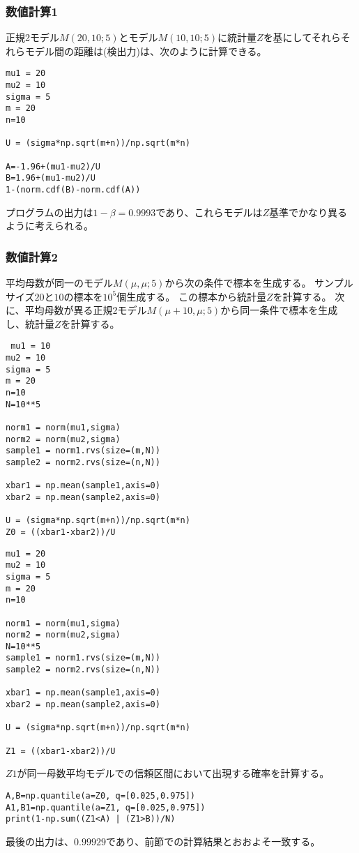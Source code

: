 \subsubsection{数値計算1}
正規2モデル$M(20,10;5)$とモデル$M(10,10;5)$に統計量$Z$を基にしてそれらそれらモデル間の距離は(検出力)は、次のように計算できる。
\begin{lstlisting}
mu1 = 20
mu2 = 10
sigma = 5
m = 20
n=10

U = (sigma*np.sqrt(m+n))/np.sqrt(m*n)

A=-1.96+(mu1-mu2)/U
B=1.96+(mu1-mu2)/U
1-(norm.cdf(B)-norm.cdf(A))
\end{lstlisting}
プログラムの出力は$1-\beta = 0.9993$であり、これらモデルは$Z$基準でかなり異るように考えられる。

\subsubsection{数値計算2}
平均母数が同一のモデル$M(\mu,\mu;5)$から次の条件で標本を生成する。
サンプルサイズ$20$と$10$の標本を$10^5$個生成する。
この標本から統計量$Z$を計算する。
次に、平均母数が異る正規2モデル$M(\mu+10,\mu;5)$から同一条件で標本を生成し、統計量$Z$を計算する。

\begin{lstlisting}
 mu1 = 10
mu2 = 10
sigma = 5
m = 20
n=10
N=10**5

norm1 = norm(mu1,sigma)
norm2 = norm(mu2,sigma)
sample1 = norm1.rvs(size=(m,N))
sample2 = norm2.rvs(size=(n,N))

xbar1 = np.mean(sample1,axis=0)
xbar2 = np.mean(sample2,axis=0)

U = (sigma*np.sqrt(m+n))/np.sqrt(m*n)
Z0 = ((xbar1-xbar2))/U

\end{lstlisting}

\begin{lstlisting}
mu1 = 20
mu2 = 10
sigma = 5
m = 20
n=10

norm1 = norm(mu1,sigma)
norm2 = norm(mu2,sigma)
N=10**5
sample1 = norm1.rvs(size=(m,N))
sample2 = norm2.rvs(size=(n,N))

xbar1 = np.mean(sample1,axis=0)
xbar2 = np.mean(sample2,axis=0)

U = (sigma*np.sqrt(m+n))/np.sqrt(m*n)

Z1 = ((xbar1-xbar2))/U
\end{lstlisting}

$Z1$が同一母数平均モデルでの信頼区間において出現する確率を計算する。
\begin{lstlisting}
A,B=np.quantile(a=Z0, q=[0.025,0.975])
A1,B1=np.quantile(a=Z1, q=[0.025,0.975])
print(1-np.sum((Z1<A) | (Z1>B))/N)
\end{lstlisting}
最後の出力は、$0.99929$であり、前節での計算結果とおおよそ一致する。


